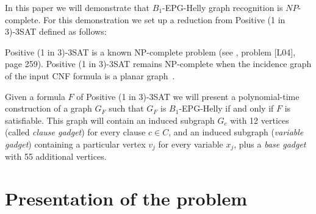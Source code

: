 \documentclass[a4paper,11pt]{article}
\begin{document}
In this paper we will demonstrate that  $B_1$-EPG-Helly graph recognition is $NP$-complete. For this demonstration we set up a reduction from {\sc Positive (1 in 3)-3SAT} defined  as follows:






{\sc Positive (1 in 3)-3SAT } is a known NP-complete problem (see \citep{johnson1979}, problem [L04], page 259). {\sc Positive (1 in 3)-3SAT} remains NP-complete when the incidence graph of the input CNF formula is a planar graph~\citep{mulzer2008minimum}.

Given a formula $F$ of {\sc Positive (1 in 3)-3SAT} we will present a polynomial-time construction of a graph $ G_F$ such that $ G_F $ is $ B_1$-EPG-Helly if and only if $ F $ is satisfiable. This graph will contain an induced subgraph $ G_c$ with 12 vertices (called \emph {clause gadget}) for every clause $ c \in C $, and an induced subgraph (\emph {variable gadget}) containing a particular vertex  $ v_j$ for every variable $ x_j$, plus a \emph{base gadget}  with 55 additional vertices.



\section{Presentation of the problem}
\end{document}
